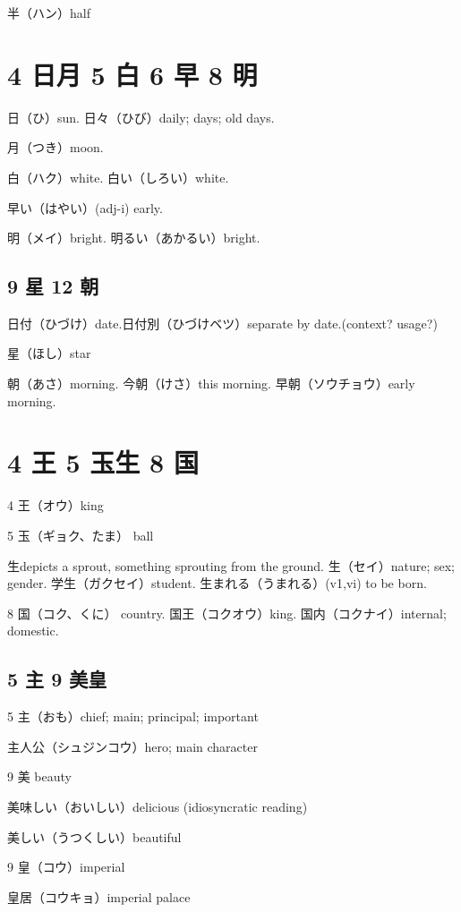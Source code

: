 半（ハン）half

\section{4 日月 5 白 6 早 8 明}

日（ひ）sun.
日々（ひび）daily; days; old days.

月（つき）moon.

白（ハク）white.
白い（しろい）white.

早い（はやい）(adj-i) early.

明（メイ）bright.
明るい（あかるい）bright.

\subsection{9 星 12 朝}

日付（ひづけ）date.日付別（ひづけベツ）separate by date.(context? usage?)

星（ほし）star

朝（あさ）morning.
今朝（けさ）this morning.
早朝（ソウチョウ）early morning.

\section{4 王 5 玉生 8 国}

4 王（オウ）king

5 玉（ギョク、たま） ball

生depicts a sprout, something sprouting from the ground.
生（セイ）nature; sex; gender.
学生（ガクセイ）student.
生まれる（うまれる）(v1,vi) to be born.

8 国（コク、くに） country.
国王（コクオウ）king.
国内（コクナイ）internal; domestic.

\subsection{5 主 9 美皇}

5 主（おも）chief; main; principal; important

主人公（シュジンコウ）hero; main character

9 美 beauty

美味しい（おいしい）delicious (idiosyncratic reading)

美しい（うつくしい）beautiful

9 皇（コウ）imperial

皇居（コウキョ）imperial palace

